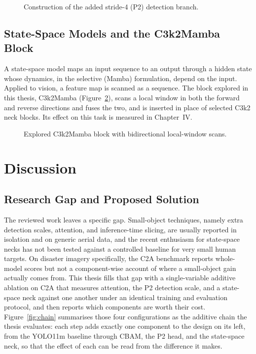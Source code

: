 \begin{figure}[tbp]
  \centering
  \caption{Construction of the added stride-4 (P2) detection branch.}
  \label{fig:p2}
\end{figure}

\subsection{State-Space Models and the C3k2Mamba Block}
A state-space model maps an input sequence to an output through a hidden state
whose dynamics, in the selective (Mamba) formulation, depend on the input. Applied
to vision, a feature map is scanned as a sequence. The block explored in this
thesis, C3k2Mamba (Figure~\ref{fig:mamba}), scans a local window in both the forward
and reverse directions and fuses the two, and is inserted in place of selected C3k2
neck blocks. Its effect on this task is measured in Chapter~IV.

\begin{figure}[tbp]
  \centering
  \caption{Explored C3k2Mamba block with bidirectional local-window scans.}
  \label{fig:mamba}
\end{figure}

\section{Discussion}

\subsection{Research Gap and Proposed Solution}
The reviewed work leaves a specific gap. Small-object techniques, namely extra
detection scales, attention, and inference-time slicing, are usually reported in
isolation and on generic aerial data, and the recent enthusiasm for state-space
necks has not been tested against a controlled baseline for very small human
targets. On disaster imagery specifically, the C2A benchmark reports whole-model
scores but not a component-wise account of where a small-object gain actually comes
from. This thesis fills that gap with a single-variable additive ablation on C2A
that measures attention, the P2 detection scale, and a state-space neck against one
another under an identical training and evaluation protocol, and then reports which
components are worth their cost. Figure~\ref{fig:chain} summarises those four
configurations as the additive chain the thesis evaluates: each step adds
exactly one component to the design on its left, from the YOLO11m baseline
through CBAM, the P2 head, and the state-space neck, so that the effect of each
can be read from the difference it makes.

